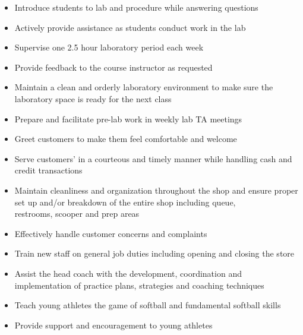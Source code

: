 \documentclass[10pt,letter,ragged2e,withhyper]{altacv}
\begin{document}
\begin{paracol}{2}

\begin{itemize}
\item Introduce students to lab and procedure while answering questions
\item Actively provide assistance as students conduct work in the lab
\item Supervise one 2.5 hour laboratory period each week
\item Provide feedback to the course instructor as requested
\item Maintain a clean and orderly laboratory environment to make sure the laboratory space is ready for the next class
\item Prepare and facilitate pre-lab work in weekly lab TA meetings
\end{itemize}

\divider

\begin{itemize}
\item Greet customers to make them feel comfortable and welcome
\item Serve customers’ in a courteous and timely manner while handling cash and credit transactions
\item Maintain cleanliness and organization throughout the shop and ensure proper set up and/or breakdown of the entire shop including queue,\\ restrooms, scooper and prep areas
\item Effectively handle customer concerns and complaints
\item Train new staff on general job duties including opening and closing the store
\end{itemize}

\divider

\begin{itemize}
\item Assist the head coach with the development, coordination and \\ implementation of practice plans, strategies and coaching techniques  
\item Teach young athletes the game of softball and fundamental softball skills
\item Provide support and encouragement to young athletes
\end{itemize}


\end{paracol}
\end{document}
